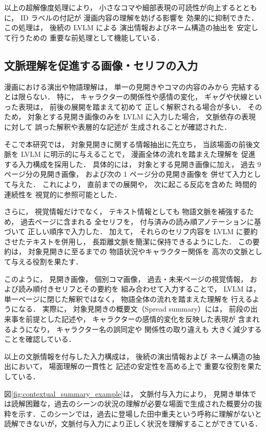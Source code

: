 \documentclass[a4j,12pt,dvipdfmx]{jsreport}
\begin{document}
以上の超解像度処理により，
小さなコマや細部表現の可読性が向上するとともに，
ID ラベルの付記が
漫画内容の理解を妨げる影響を
効果的に抑制できた．
この処理は，
後続の LVLM による
演出情報およびネーム構造の抽出を
安定して行うための
重要な前処理として機能している．

\subsection{文脈理解を促進する画像・セリフの入力}\label{sec:contextual_input}

漫画における演出や物語理解は，
単一の見開きやコマの内容のみから
完結するとは限らない．
特に，
キャラクターの関係性や感情の変化，
ギャグや伏線といった表現は，
前後の展開を踏まえて初めて
正しく解釈される場合が多い．
そのため，
対象とする見開き画像のみを
LVLM に入力した場合，
文脈依存の表現に対して
誤った解釈や表層的な記述が
生成されることが確認された．

そこで本研究では，
対象見開きに関する情報抽出に先立ち，
当該場面の前後文脈を
LVLM に明示的に与えることで，
漫画全体の流れを踏まえた理解を
促進する入力構成を採用した．
具体的には，
対象とする見開き画像に加え，
過去 9 ページ分の見開き画像，
および次の 1 ページ分の見開き画像を
併せて入力として与えた．
これにより，
直前までの展開や，
次に起こる反応を含めた
時間的連続性を
視覚的に参照可能とした．

さらに，
視覚情報だけでなく，
テキスト情報としても
物語文脈を補強するため，
過去ページに含まれる
全セリフを，
付与済みの読み順アノテーションに基づいて
正しい順序で入力した．
加えて，
それらのセリフ内容を
LVLM に要約させたテキストを併用し，
長距離文脈を簡潔に保持できるようにした．
この要約は，
対象見開きに至るまでの
物語状況やキャラクター関係を
高次の文脈として与える役割を果たす．

このように，
見開き画像，
個別コマ画像，
過去・未来ページの視覚情報，
および読み順付きセリフとその要約を
組み合わせて入力することで，
LVLM は，
単一ページに閉じた解釈ではなく，
物語全体の流れを踏まえた理解を
行えるようになる．
実際に，
対象見開きの概要文（Spread summary）には，
前段の出来事を前提とした記述や，
キャラクターの感情的変化を反映した表現が
含まれるようになり，
キャラクター名の誤同定や
関係性の取り違えも
大きく減少することを確認している．

以上の文脈情報を付与した入力構成は，
後続の演出情報および
ネーム構造の抽出において，
場面理解の一貫性と
記述の安定性を高める上で
重要な役割を果たしている．

図\ref{fig:contextual_summary_example}は，
文脈付与入力により，
見開き単体では読解困難な，過去のシーンの状況の理解が必要な場面で生成された概要分の抜粋を示す．このシーンでは，過去に登場した田中重夫という呼称に理解がないと読解できないが，文脈付与入力により正しく状況を理解することができている．
\end{document}
